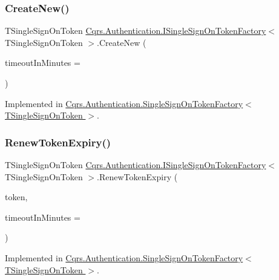 \subsubsection{\texorpdfstring{Create\+New()}{CreateNew()}}
{\footnotesize\ttfamily T\+Single\+Sign\+On\+Token \hyperlink{interfaceCqrs_1_1Authentication_1_1ISingleSignOnTokenFactory}{Cqrs.\+Authentication.\+I\+Single\+Sign\+On\+Token\+Factory}$<$ T\+Single\+Sign\+On\+Token $>$.Create\+New (\begin{DoxyParamCaption}\item[{int}]{timeout\+In\+Minutes = {} }\end{DoxyParamCaption})}



Implemented in \hyperlink{classCqrs_1_1Authentication_1_1SingleSignOnTokenFactory_ab4d01a3600dbe9aa358cd93c98ccf281_ab4d01a3600dbe9aa358cd93c98ccf281}{Cqrs.\+Authentication.\+Single\+Sign\+On\+Token\+Factory$<$ T\+Single\+Sign\+On\+Token $>$}.

\mbox{\label{interfaceCqrs_1_1Authentication_1_1ISingleSignOnTokenFactory_ab436004ad1631140f7a58927cbacd8c4_ab436004ad1631140f7a58927cbacd8c4}} 
\subsubsection{\texorpdfstring{Renew\+Token\+Expiry()}{RenewTokenExpiry()}}
{\footnotesize\ttfamily T\+Single\+Sign\+On\+Token \hyperlink{interfaceCqrs_1_1Authentication_1_1ISingleSignOnTokenFactory}{Cqrs.\+Authentication.\+I\+Single\+Sign\+On\+Token\+Factory}$<$ T\+Single\+Sign\+On\+Token $>$.Renew\+Token\+Expiry (\begin{DoxyParamCaption}\item[{T\+Single\+Sign\+On\+Token}]{token,  }\item[{int}]{timeout\+In\+Minutes = {} }\end{DoxyParamCaption})}



Implemented in \hyperlink{classCqrs_1_1Authentication_1_1SingleSignOnTokenFactory_a699ceac65874b8319d2e26fa88f554be_a699ceac65874b8319d2e26fa88f554be}{Cqrs.\+Authentication.\+Single\+Sign\+On\+Token\+Factory$<$ T\+Single\+Sign\+On\+Token $>$}.

